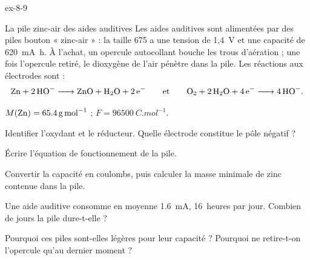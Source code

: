 \begin{blocLivre}{ex-8-9}
\begin{exercice}[2]{La pile zinc-air des aides auditives}
Les aides auditives sont alimentées par des piles bouton « zinc-air » : la taille 675 a une tension de 1,4~V et une
capacité de \qty{620}{mA.h}. À l'achat, un opercule autocollant bouche les trous d'aération ; une fois l'opercule retiré,
le dioxygène de l'air pénètre dans la pile. Les réactions aux électrodes sont :
\[\ce{Zn + 2 HO- -> ZnO + H2O + 2 e-}\qquad\text{et}\qquad\ce{O2 + 2 H2O + 4 e- -> 4 HO-}.\]
\begin{donnees}
$M(\ce{Zn})=\qty{65,4}{g.mol^{-1}}$ ; $F=\qty{96500}{C.mol^{-1}}$.
\end{donnees}
\begin{questions}
\item Identifier l'oxydant et le réducteur. Quelle électrode constitue le pôle négatif ?
\item Écrire l'équation de fonctionnement de la pile.
\item Convertir la capacité en coulombs, puis calculer la masse minimale de zinc contenue dans la pile.
\item Une aide auditive consomme en moyenne \qty{1,6}{mA}, 16~heures par jour. Combien de jours la pile dure-t-elle ?
\item Pourquoi ces piles sont-elles légères pour leur capacité ? Pourquoi ne retire-t-on l'opercule qu'au dernier moment ?
\end{questions}
\end{exercice}
\end{blocLivre}
